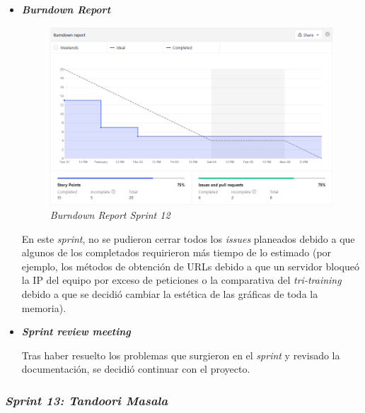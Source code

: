 \begin{itemize}
	\item \textbf{\textit{Burndown Report}}
		\begin{figure}[h]
		\caption{\textit{Burndown Report Sprint 12}}
			\centering
			\includegraphics[width=\textwidth]{../img/anexos/bdr/s12_bdr}
		\end{figure}
		
		En este \textit{sprint}, no se pudieron cerrar todos los \textit{issues} planeados debido a que algunos de los completados requirieron más tiempo de lo estimado (por ejemplo, los métodos de obtención de URLs debido a que un servidor bloqueó la IP del equipo por exceso de peticiones o la comparativa del \textit{tri-training} debido a que se decidió cambiar la estética de las gráficas de toda la memoria).
		
	\item \textbf{\textit{Sprint review meeting}}
	
	Tras haber resuelto los problemas que surgieron en el \textit{sprint} y revisado la documentación, se decidió continuar con el proyecto.
	\end{itemize}




\subsubsection{\textit{Sprint 13: Tandoori Masala}}

